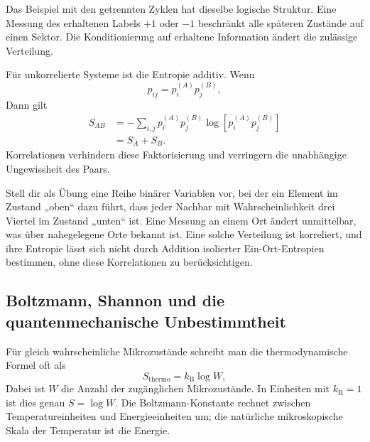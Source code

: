 Das Beispiel mit den getrennten Zyklen hat dieselbe logische Struktur. Eine Messung des erhaltenen
Labels \(+1\) oder \(-1\) beschränkt alle späteren Zustände auf einen Sektor.
Die Konditionierung auf erhaltene Information ändert die zulässige Verteilung.

Für unkorrelierte Systeme ist die Entropie additiv. Wenn
\begin{equation}
 p_{ij}=p_i^{(A)}p_j^{(B)},
\end{equation}
Dann gilt
\begin{align}
 S_{AB}
 &=-\sum_{i,j}p_i^{(A)}p_j^{(B)}
 \log\!\left[p_i^{(A)}p_j^{(B)}\right]\\
 &=S_A+S_B.
 \label{eq:sm1-entropy-additivity}
\end{align}
Korrelationen verhindern diese Faktorisierung und verringern die unabhängige
Ungewissheit des Paars.

Stell dir als Übung eine Reihe binärer Variablen vor, bei der ein Element im Zustand „oben“ dazu führt,
dass jeder Nachbar mit Wahrscheinlichkeit drei Viertel im Zustand „unten“ ist. Eine Messung an einem Ort
ändert unmittelbar, was über nahegelegene Orte bekannt ist. Eine solche Verteilung ist korreliert, und ihre
Entropie lässt sich nicht durch Addition isolierter Ein-Ort-Entropien bestimmen, ohne diese Korrelationen
zu berücksichtigen.

\subsection{Boltzmann, Shannon und die quantenmechanische Unbestimmtheit}

\begin{classroomqa}
\end{classroomqa}

Für gleich wahrscheinliche Mikrozustände schreibt man die thermodynamische Formel oft als
\begin{equation}
 S_{\mathrm{thermo}}=k_{\mathrm B}\log W,
 \label{eq:sm1-boltzmann-formula}
\end{equation}
Dabei ist \(W\) die Anzahl der zugänglichen Mikrozustände. In Einheiten mit
\(k_{\mathrm B}=1\) ist dies genau \(S=\log W\). Die Boltzmann-Konstante rechnet zwischen Temperatureinheiten
und Energieeinheiten um; die natürliche mikroskopische Skala der Temperatur ist die Energie.

